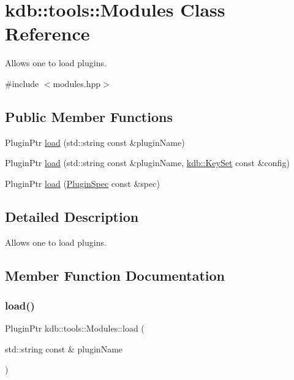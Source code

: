 \hypertarget{classkdb_1_1tools_1_1Modules}{}\section{kdb\+:\+:tools\+:\+:Modules Class Reference}
\label{classkdb_1_1tools_1_1Modules}


Allows one to load plugins.  




{\ttfamily \#include $<$modules.\+hpp$>$}

\subsection*{Public Member Functions}
\begin{DoxyCompactItemize}
\item 
Plugin\+Ptr \hyperlink{classkdb_1_1tools_1_1Modules_ae8d8c91745c9f517e6e8a556f1664f69}{load} (std\+::string const \&plugin\+Name)
\item 
Plugin\+Ptr \hyperlink{classkdb_1_1tools_1_1Modules_a6ae72cc8e30fe3fb0aabd6f78fad8ddf}{load} (std\+::string const \&plugin\+Name, \hyperlink{classkdb_1_1KeySet}{kdb\+::\+Key\+Set} const \&config)
\item 
Plugin\+Ptr \hyperlink{classkdb_1_1tools_1_1Modules_abdbcc54896557ad3123d0a12be9f437a}{load} (\hyperlink{classkdb_1_1tools_1_1PluginSpec}{Plugin\+Spec} const \&spec)
\end{DoxyCompactItemize}


\subsection{Detailed Description}
Allows one to load plugins. 

\subsection{Member Function Documentation}
\mbox{\label{classkdb_1_1tools_1_1Modules_ae8d8c91745c9f517e6e8a556f1664f69}} 
\subsubsection{\texorpdfstring{load()}{load()}\hspace{0.1cm}{\footnotesize\ttfamily [1/3]}}
{\footnotesize\ttfamily Plugin\+Ptr kdb\+::tools\+::\+Modules\+::load (\begin{DoxyParamCaption}\item[{std\+::string const \&}]{plugin\+Name }\end{DoxyParamCaption})}

